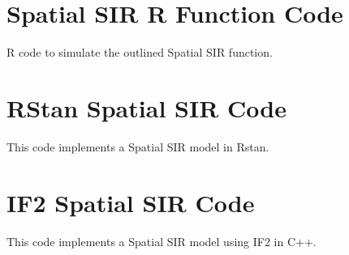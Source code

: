 
\section{Spatial SIR R Function Code}

	R code to simulate the outlined Spatial SIR function.

	

\section{RStan Spatial SIR Code}

    This code implements a Spatial SIR model in Rstan.

    

\section{IF2 Spatial SIR Code}

    This code implements a Spatial SIR model using IF2 in C++.

    